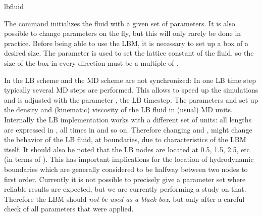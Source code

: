 \begin{essyntax}
  lbfluid
  \begin{features}
  \end{features}
\end{essyntax}
The  command initializes the fluid with a given
set of parameters. It is also possible to change parameters on the
fly, but this will only rarely be done in practice. Before being able
to use the LBM, it is necessary to set up a box of a desired size. The
parameter  is used to set the lattice constant of the
fluid, so the size of the box in every direction must be a multiple of
.

In \es the LB scheme and the MD scheme are not synchronized: In one LB
time step typically several MD steps are performed. This allows to
speed up the simulations and is adjusted with the parameter ,
the LB timestep.
The parameters  and  set up the density and
(kinematic) viscosity of the LB fluid in (usual) MD units.  Internally the LB
implementation works with a different set of units: all lengths are
expressed in , all times in  and so on.  Therefore
changing  and , might change the behavior of the
LB fluid, \eg at boundaries, due to characteristics of the LBM
itself. It should also be noted that the LB nodes are located at 0.5, 1.5, 2.5,
etc (in terms of ).  This has important implications for the
location of hydrodynamic boundaries which are generally considered
to be halfway between two nodes to first order.
Currently it is not possible to precisely give a parameter set
where reliable results are expected, but we are currently performing a
study on that. Therefore the LBM should \emph{not be used as a black
  box}, but only after a careful check of all parameters that were
applied. 

